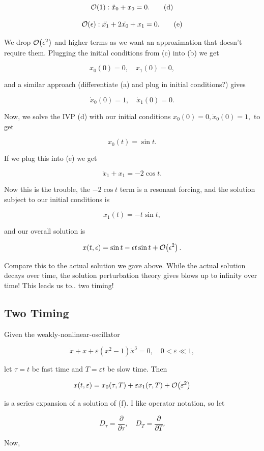 \documentclass{article}
\begin{document}
\[ \mathcal{O}\!\left(1\right): \ddot{x}_0 + x_0 = 0. \tag{d} \]

\[ \mathcal{O}\!\left(\epsilon\right): \ddot{x_1} + 2 \dot{x_0} + x_1 = 0. \tag{e} \]

We drop $\mathcal{O}\!\left(\epsilon^2\right)$ and higher terms as we want an approximation that doesn't require them. Plugging the initial conditions from (c) into (b) we get

\[ x_0(0) = 0, \quad x_1(0) = 0, \]

and a similar approach (differentiate (a) and plug in initial conditions?) gives

\[ \dot{x}_0(0) = 1, \quad \dot{x}_1(0) = 0. \]

Now, we solve the IVP (d) with our initial conditions $x_0(0) = 0, \dot{x}_0(0) = 1,$ to get

\[ x_0(t) = \sin{t}. \]

If we plug this into (e) we get

\[ \ddot{x}_1 + x_1 = -2 \cos{t}. \]

Now this is the trouble, the $-2 \cos{t}$ term is a resonant forcing, and the solution subject to our initial conditions is

\[ x_1(t) = -t \sin{t}, \]

and our overall solution is 

\[ x(t, \epsilon) = \sin{t} - \epsilon t \sin{t} + \mathcal{O}\!\left(\epsilon^2\right). \]

Compare this to the actual solution we gave above. While the actual solution decays over time, the solution perturbation theory gives blows up to infinity over time! This leads us to.. two timing!

\subsection{Two Timing}
Given the \@{weakly-nonlinear-oscillator}

\[ \ddot{x} + x + \varepsilon(x^2 - 1)\dot{x}^3 = 0, \quad 0 < \varepsilon \ll 1, \tag{f} \]

let $\tau = t$ be fast time and $T = \varepsilon t$ be slow time. Then

\[ x(t, \varepsilon) = x_0(\tau,T) + \varepsilon x_1(\tau, T) + \mathcal{O}\!\left(\varepsilon^2\right) \]

is a series expansion of a solution of (f). I like operator notation, so let

\[ D_\tau = \frac{\partial}{\partial \tau}, \quad D_T = \frac{\partial}{\partial T}. \]

Now,
\end{document}
